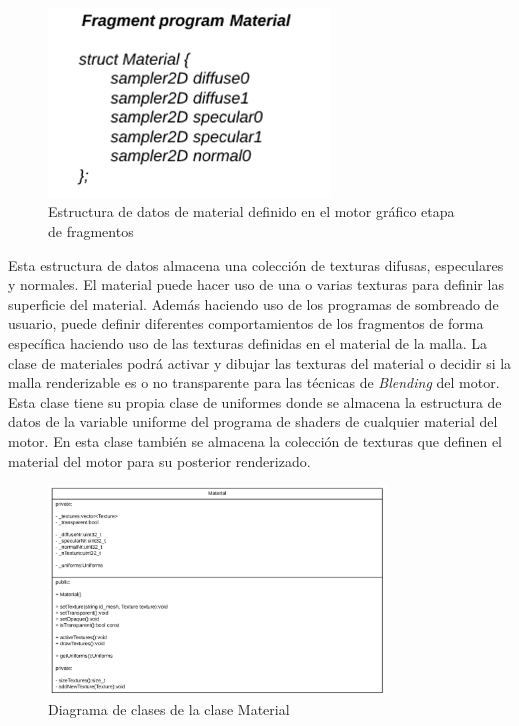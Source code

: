 \documentclass[a4paper]{book}
\begin{document}
\begin{figure}[H]
    \centering
    \includegraphics[width=7.5cm, keepaspectratio]{img/material.png}
    \caption{Estructura de datos de material definido en el motor gráfico etapa de fragmentos}
    \label{Material}
\end{figure}

Esta estructura de datos almacena una colección de texturas difusas, especulares y normales. El material puede hacer uso de una o
varias texturas para definir las superficie del material. Además haciendo uso de los programas de sombreado de usuario, puede definir
diferentes comportamientos de los fragmentos de forma específica haciendo uso de las texturas definidas en el material de la malla. La clase
de materiales podrá activar y dibujar las texturas del material o decidir si la malla renderizable es o no transparente para
las técnicas de \textit{Blending} del motor. Esta clase tiene su propia clase de uniformes donde se almacena la estructura de datos de la variable
uniforme del programa de shaders de cualquier material del motor. En esta clase también se almacena la colección de texturas que definen
el material del motor para su posterior renderizado.

\begin{figure}[H]
    \centering
    \includegraphics[width=9cm, keepaspectratio]{img/Material.png}
    \caption{Diagrama de clases de la clase Material}
    \label{material_class}
\end{figure}
\end{document}
